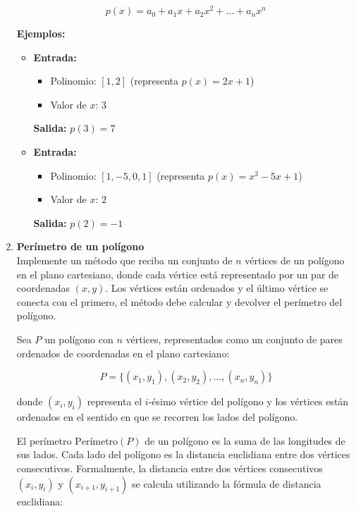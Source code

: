 \begin{enumerate}
    \[
    p(x) = a_0 + a_1 x + a_2 x^2 + \dots + a_n x^n
    \]

    \textbf{Ejemplos:}
    \begin{itemize}
        \item \textbf{Entrada:}
        \begin{itemize}
            \item Polinomio: \([1, 2]\) (representa \(p(x) = 2x + 1\))
            \item Valor de \(x\): \(3\)
        \end{itemize}
        \textbf{Salida:} \( p(3) = 7 \)
        
        \item \textbf{Entrada:}
        \begin{itemize}
            \item Polinomio: \([1, -5, 0, 1]\) (representa \(p(x) = x^3 - 5x + 1\))
            \item Valor de \(x\): \(2\)
        \end{itemize}
        \textbf{Salida:} \( p(2) = -1 \)
    \end{itemize}
    
    \item \textbf{Perímetro de un polígono}\\
    Implemente un método que reciba un conjunto de \(n\) vértices de un polígono en el plano cartesiano, donde cada vértice está representado por un par de coordenadas \((x, y)\). Los vértices están ordenados y el último vértice se conecta con el primero, el método debe calcular y devolver el perímetro del polígono.
        
    Sea \( P \) un polígono con \( n \) vértices, representados como un conjunto de pares ordenados de coordenadas en el plano cartesiano:

    \[
    P = \{ (x_1, y_1), (x_2, y_2), \dots, (x_n, y_n) \}
    \]
    
    donde \( (x_i, y_i) \) representa el \( i \)-ésimo vértice del polígono y los vértices están ordenados en el sentido en que se recorren los lados del polígono. 
    
    El perímetro \( \text{Perímetro}(P) \) de un polígono es la suma de las longitudes de sus lados. Cada lado del polígono es la distancia euclidiana entre dos vértices consecutivos. Formalmente, la distancia entre dos vértices consecutivos \( (x_i, y_i) \) y \( (x_{i+1}, y_{i+1}) \) se calcula utilizando la fórmula de distancia euclidiana:
    

\end{enumerate}

